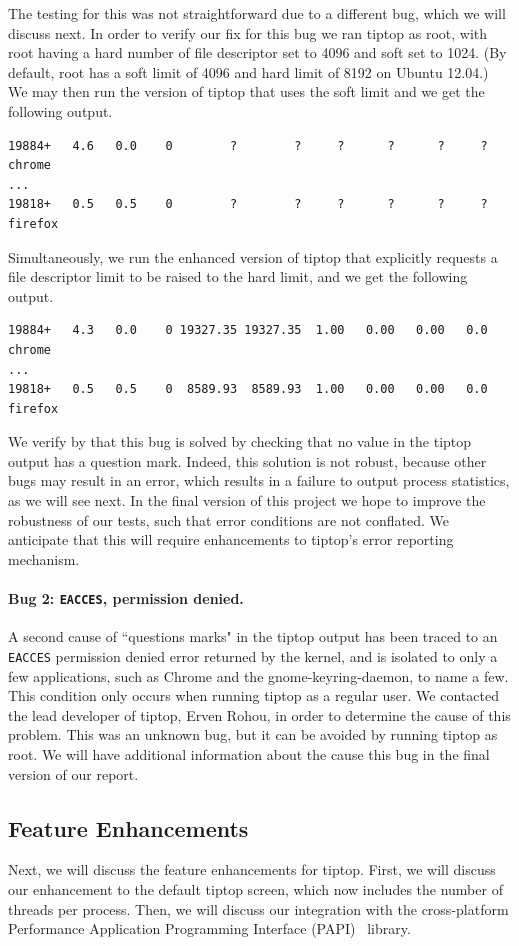 The testing for this was not straightforward due to a different bug, which we will discuss next.
In order to verify our fix for this bug we ran tiptop as root, with root having a hard number of file descriptor set to 4096 and soft set to 1024. (By default, root has a soft limit of 4096 and hard limit of 8192 on Ubuntu 12.04.)
We may then run the version of tiptop that uses the soft limit and we get the following output.
\begin{verbatim}
19884+   4.6   0.0    0        ?        ?     ?      ?      ?     ? chrome
...
19818+   0.5   0.5    0        ?        ?     ?      ?      ?     ? firefox
\end{verbatim}

Simultaneously, we run the enhanced version of tiptop that explicitly requests a file descriptor limit to be raised to the hard limit, and we get the following output.
\begin{verbatim}
19884+   4.3   0.0    0 19327.35 19327.35  1.00   0.00   0.00   0.0 chrome
...
19818+   0.5   0.5    0  8589.93  8589.93  1.00   0.00   0.00   0.0 firefox
\end{verbatim}

We verify by that this bug is solved by checking that no value in the tiptop output has a question mark. Indeed, this solution is not robust, because other bugs may result in an error, which results in a failure to output process statistics, as we will see next.
In the final version of this project we hope to improve the robustness of our tests, such that error conditions are not conflated. We anticipate that this will require enhancements to tiptop's error reporting mechanism.

\paragraph{Bug 2: \texttt{EACCES}, permission denied.}
A second cause of ``questions marks" in the tiptop output has been traced to an \texttt{EACCES} permission denied error returned by the kernel, and is isolated to only a few applications, such as Chrome and the gnome-keyring-daemon, to name a few.
This condition only occurs when running tiptop as a regular user.
We contacted the lead developer of tiptop, Erven Rohou, in order to determine the cause of this problem.
This was an unknown bug, but it can be avoided by running tiptop as root.
We will have additional information about the cause this bug in the final version of our report.

\subsection{Feature Enhancements}
Next, we will discuss the feature enhancements for tiptop.
First, we will discuss our enhancement to the default tiptop screen, which now includes the number of threads per process.
Then, we will discuss our integration with the cross-platform Performance Application Programming Interface (PAPI)~\cite{Mucci99papi:a} library.


